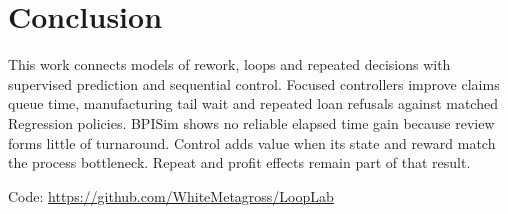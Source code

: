 \documentclass[conference]{IEEEtran}
\begin{document}
\section{Conclusion}
\label{sec:conclusion}

This work connects models of rework, loops and repeated decisions with supervised prediction and sequential control. Focused controllers improve claims queue time, manufacturing tail wait and repeated loan refusals against matched Regression policies. BPISim shows no reliable elapsed time gain because review forms little of turnaround. Control adds value when its state and reward match the process bottleneck. Repeat and profit effects remain part of that result.

\noindent Code: \url{https://github.com/WhiteMetagross/LoopLab}

\FloatBarrier


\end{document}
